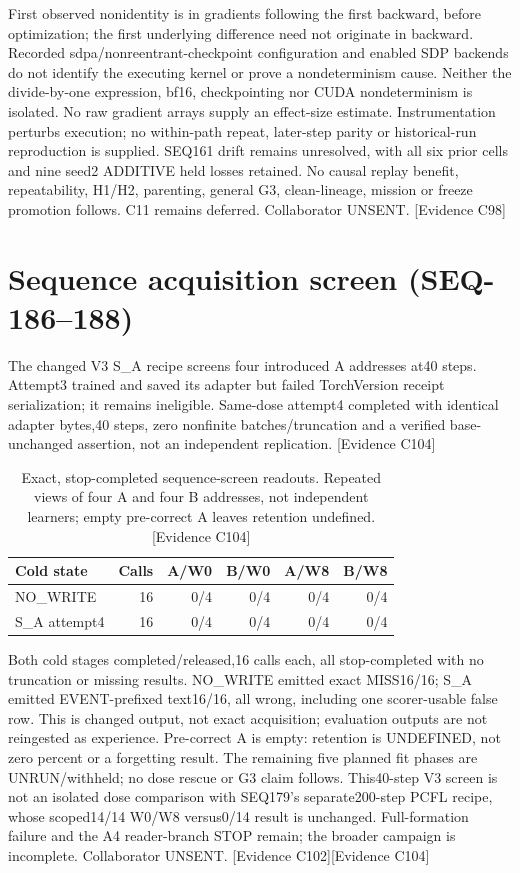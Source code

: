 \documentclass[11pt]{article}
\newcommand{\ev}[1]{\textsf{[Evidence #1]}}
\begin{document}
First observed nonidentity is in gradients following the first backward, before
optimization; the first underlying difference need not originate in backward.
Recorded sdpa/nonreentrant-checkpoint configuration and enabled SDP backends do
not identify the executing kernel or prove a nondeterminism cause. Neither the
divide-by-one expression, bf16, checkpointing nor CUDA nondeterminism is isolated.
No raw gradient arrays supply an effect-size estimate. Instrumentation perturbs
execution; no within-path repeat, later-step parity or historical-run reproduction
is supplied. SEQ161 drift remains unresolved, with all six prior cells and nine
seed2 ADDITIVE held losses retained. No causal replay benefit, repeatability,
H1/H2, parenting, general G3, clean-lineage, mission or freeze promotion follows.
C11 remains deferred. Collaborator UNSENT.
 \ev{C98}

\section{Sequence acquisition screen (SEQ-186--188)}
The changed V3 S\_A recipe screens four introduced A addresses at40 steps.
Attempt3 trained and saved its adapter but failed TorchVersion receipt
serialization; it remains ineligible. Same-dose attempt4 completed with
identical adapter bytes,40 steps, zero nonfinite batches/truncation and a
verified base-unchanged assertion, not an independent replication. \ev{C104}

\begin{table}[ht]
\centering\small
\begin{tabular}{lrrrrr}
\toprule
Cold state & Calls & A/W0 & B/W0 & A/W8 & B/W8 \\
\midrule
NO\_WRITE & 16 & 0/4 & 0/4 & 0/4 & 0/4 \\
S\_A attempt4 & 16 & 0/4 & 0/4 & 0/4 & 0/4 \\
\bottomrule
\end{tabular}
\caption{Exact, stop-completed sequence-screen readouts. Repeated views of
four A and four B addresses, not independent learners; empty pre-correct A
leaves retention undefined. \ev{C104}}
\end{table}

Both cold stages completed/released,16 calls each, all stop-completed with
no truncation or missing results. NO\_WRITE emitted exact MISS16/16; S\_A emitted
EVENT-prefixed text16/16, all wrong, including one scorer-usable false row.
This is changed output, not exact acquisition; evaluation outputs are not
reingested as experience. Pre-correct A is empty: retention is UNDEFINED,
not zero percent or a forgetting result. The remaining five planned fit phases
are UNRUN/withheld; no dose rescue or G3 claim follows. This40-step V3 screen
is not an isolated dose comparison with SEQ179's separate200-step PCFL recipe,
whose scoped14/14 W0/W8 versus0/14 result is unchanged. Full-formation failure
and the A4 reader-branch STOP remain; the broader campaign is incomplete.
Collaborator UNSENT. \ev{C102}\ev{C104}
\end{document}
